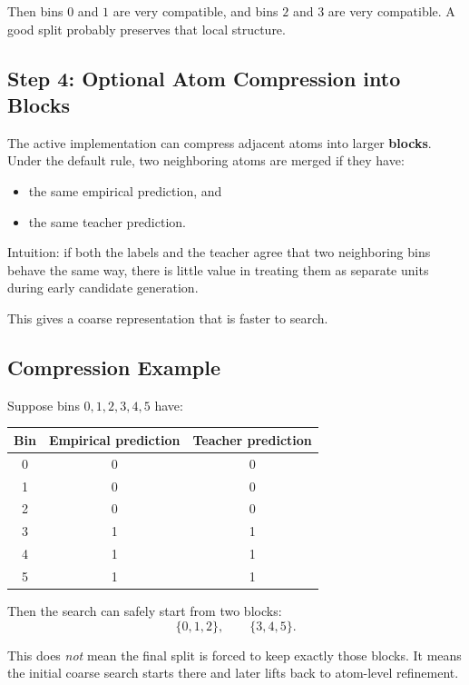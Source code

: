 \documentclass[11pt]{article}
\begin{document}
Then bins \(0\) and \(1\) are very compatible, and bins \(2\) and \(3\) are very compatible. A good split probably preserves that local structure.

\subsection{Step 4: Optional Atom Compression into Blocks}

The active implementation can compress adjacent atoms into larger \textbf{blocks}. Under the default rule, two neighboring atoms are merged if they have:

\begin{itemize}
\item the same empirical prediction, and
\item the same teacher prediction.
\end{itemize}

Intuition: if both the labels and the teacher agree that two neighboring bins behave the same way, there is little value in treating them as separate units during early candidate generation.

This gives a coarse representation that is faster to search.

\subsection{Compression Example}

Suppose bins \(0,1,2,3,4,5\) have:

\begin{center}
\begin{tabular}{|c|c|c|}
\hline
Bin & Empirical prediction & Teacher prediction \\
\hline
0 & 0 & 0 \\
1 & 0 & 0 \\
2 & 0 & 0 \\
3 & 1 & 1 \\
4 & 1 & 1 \\
5 & 1 & 1 \\
\hline
\end{tabular}
\end{center}

Then the search can safely start from two blocks:
\[
\{0,1,2\}, \qquad \{3,4,5\}.
\]

This does \emph{not} mean the final split is forced to keep exactly those blocks. It means the initial coarse search starts there and later lifts back to atom-level refinement.
\end{document}
